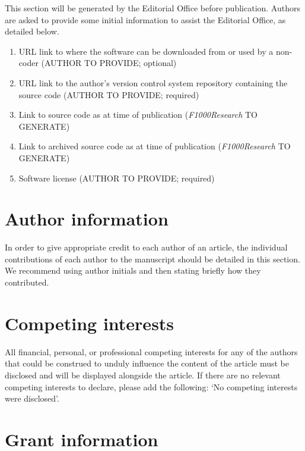 \documentclass[9pt,a4paper,]{extarticle}
\begin{document}
This section will be generated by the Editorial Office before publication. Authors are asked to provide some initial information to assist the Editorial Office, as detailed below.

\begin{enumerate}
\def\labelenumi{\arabic{enumi}.}
\item
  URL link to where the software can be downloaded from or used by a non-coder (AUTHOR TO PROVIDE; optional)
\item
  URL link to the author's version control system repository containing the source code (AUTHOR TO PROVIDE; required)
\item
  Link to source code as at time of publication (\emph{F1000Research} TO GENERATE)
\item
  Link to archived source code as at time of publication (\emph{F1000Research} TO GENERATE)
\item
  Software license (AUTHOR TO PROVIDE; required)
\end{enumerate}

\hypertarget{author-information}{%
\section{Author information}\label{author-information}}

In order to give appropriate credit to each author of an article, the individual contributions of each author to the manuscript should be detailed in this section. We recommend using author initials and then stating briefly how they contributed.

\hypertarget{competing-interests}{%
\section{Competing interests}\label{competing-interests}}

All financial, personal, or professional competing interests for any of the authors that could be construed to unduly influence the content of the article must be disclosed and will be displayed alongside the article. If there are no relevant competing interests to declare, please add the following: `No competing interests were disclosed'.

\hypertarget{grant-information}{%
\section{Grant information}\label{grant-information}}
\end{document}
